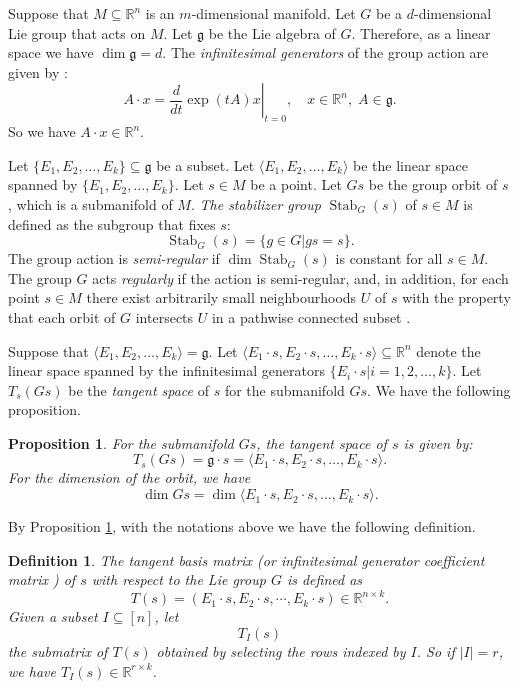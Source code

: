 \documentclass[10pt,a4paper]{amsart}
\newtheorem{proposition}[theorem]{Proposition}
\newtheorem{definition}[theorem]{Definition}
\numberwithin{equation}{section}
\begin{document}
Suppose that  $M\subseteq \mathbb{R}^n$ is an $m$-dimensional manifold. Let $G$ be a $d$-dimensional Lie group that acts on $M$. Let  $\mathfrak{g}$ be the Lie algebra of $G$. Therefore, as a linear space we have $\dim \mathfrak{g}=d$. The \emph{infinitesimal generators} of the group action are given by \cite[(1.48)]{olver93li}:
\begin{equation}\label{eq-infgen}
A\cdot x =\left.\frac{d}{dt}\exp(tA)x\right|_{t=0},
\quad x \in \mathbb{R}^n,\; A \in \mathfrak{g}.
\end{equation}
So we have $A\cdot x\in \mathbb{R}^n$.


Let $\{E_1,E_2,\ldots,E_k\}\subseteq \mathfrak{g}$ be a subset.
Let $\langle E_1,E_2,\ldots,E_k\rangle$ be the linear space spanned by $\{E_1,E_2,\ldots,E_k\}$.
Let $s\in M$ be a point. Let $Gs$ be the group orbit of $s$, which is a submanifold of $M$. 
\emph{The stabilizer group} $\operatorname{Stab}_G(s)$  of $s\in M$ is defined as the subgroup that fixes $s$:
$$\operatorname{Stab}_G(s)=\{g\in G|gs=s\}.$$
The group action is \emph{semi-regular} if $\dim \operatorname{Stab}_G(s)$ is constant for all $s\in M$. The group $G$ acts \emph{regularly} if the action is semi-regular, and, in addition, for each point $s\in M$ there exist arbitrarily small neighbourhoods $U$ of $s$  with the property that each orbit of $G$ intersects $U$ in a pathwise connected subset \cite{olver93li}.

Suppose that $\langle E_1,E_2,\ldots,E_k\rangle=\mathfrak{g}$. Let $\langle E_1\cdot s, E_2\cdot s,\ldots,E_k\cdot s\rangle \subseteq \mathbb{R}^n$ denote the linear space spanned by the infinitesimal generators $\{ E_i\cdot s|i=1,2,\ldots,k\}$. Let $T_s(Gs)$ be the \emph{tangent space} of $s$ for the submanifold $Gs$. We have the following proposition.
\begin{proposition}\cite[Prop. 2.65]{olver95e}\label{prop-tdim}
 For the submanifold $Gs$, the tangent space of $s$ is given by:
$$T_s (Gs)=\mathfrak{g}\cdot s=\langle E_1\cdot s, E_2\cdot s,\ldots,E_k\cdot s\rangle.$$
For the dimension of the orbit, we have
\begin{equation*}
\dim Gs=\dim \langle E_1\cdot s, E_2\cdot s,\ldots,E_k\cdot s\rangle.
\end{equation*}
\end{proposition}

By Proposition \ref{prop-tdim}, with the notations above we have the following definition.
\begin{definition}\label{def-tsm}
The \emph{tangent basis matrix} (or infinitesimal generator coefficient matrix \cite{folver99mcf, Hubert07sa}) of $s$ with respect to the Lie group $G$ is defined as
\begin{equation}\label{eq-Ts}
T(s)=\left(E_1\cdot s, E_2\cdot s,\cdots,E_k\cdot s\right)
\in \mathbb{R}^{n\times k}.
\end{equation}
Given a subset $I\subseteq [n]$, let 
\begin{equation}\label{eq-Tis}
T_I(s)
\end{equation}
the submatrix of $T(s)$ obtained by selecting
the rows indexed by $I$. So if $|I|=r$, we have $T_I(s)\in \mathbb{R}^{r\times k}$.
\end{definition}
\end{document}
